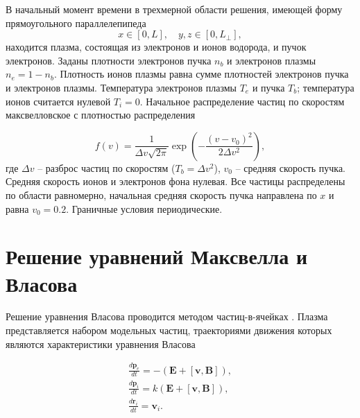 В начальный момент времени в трехмерной области
решения, имеющей форму прямоугольного параллелепипеда $$
x\in[0,L],\quad y,z\in[0,L_\bot], $$ находится плазма, состоящая из
электронов и ионов водорода, и пучок электронов. Заданы плотности электронов пучка $n_b$ и электронов плазмы $n_e = 1-n_b$. Плотность ионов плазмы равна сумме плотностей электронов пучка и электронов плазмы. Температура электронов плазмы $T_e$ и пучка $T_b$; температура ионов считается нулевой $T_i=0$. Начальное распределение частиц по скоростям макс\-вел\-ловс\-кое с плотностью распределения

$$
f(v)=\frac{1}{\Delta v \sqrt{2
		\pi}}\exp \left( {-\frac{(v-v_0)^2}{2 \Delta v^2}}\right) ,
$$
где $\Delta v$ -- разброс частиц по скоростям ($T_b=\Delta v^2$), $v_0$ -- средняя
скорость пучка. Средняя скорость ионов и электронов фона нулевая. Все частицы распределены по области равномерно, начальная средняя скорость пучка направлена по $x$ и равна $v_0=0.2$. Граничные условия периодические. 








\section{Решение уравнений Максвелла и Власова}

Решение уравнения Власова проводится методом
частиц-в-ячейках \cite{hockney, birdsall2004plasma}. Плазма представляется набором модельных частиц, траекториями движения которых являются характеристики урав\-не\-ния Власова

\begin{equation}\label{eq:char}
\begin{array}{c}
\frac{d {\textbf{p}} _{e}}{d t}=-(\textbf{E}+[\textbf{v},\textbf{B}]), \\
\frac{d {\textbf{p}} _{i}}{d t}=k(\textbf{E}+[\textbf{v},\textbf{B}]), \\
\frac{d {\textbf{r}} _{i}}{d t}={\textbf{v}}_{i}.
\end{array}
\end{equation}


